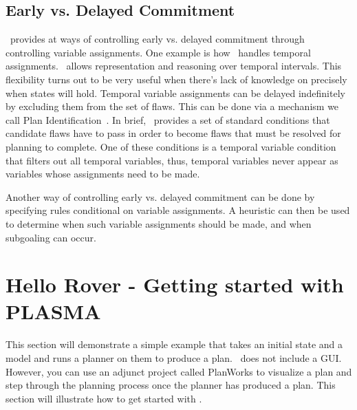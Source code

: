 \documentclass[10pt, letterpaper, twoside]{article}
\begin{document}
\subsection{Early vs. Delayed Commitment}
\label{commitment}
\ET\, provides at ways of controlling early vs. delayed commitment through
controlling variable assignments.  One example is how \ET\, handles
temporal assignments.  \ET\, allows representation and reasoning over
temporal intervals.  This flexibility turns out to be very useful when
there's lack of knowledge on precisely when states will hold.  Temporal
variable assignments can be delayed indefinitely by excluding them from the
set of flaws.  This can be done via a mechanism we call Plan
Identification~\cite{planid}.  In brief, \ET\, provides a set of standard
conditions that candidate flaws have to pass in order to become flaws that
must be resolved for planning to complete.  One of these conditions is a
temporal variable condition that filters out all temporal variables, thus,
temporal variables never appear as variables whose assignments need to be
made. 

Another way of controlling early vs. delayed commitment can be done by
specifying rules conditional on variable assignments.  A heuristic can then
be used to determine when such variable assignments should be made, and
when subgoaling can occur.

\section{Hello Rover - Getting started with PLASMA}
\label{started}
This section will demonstrate a simple example that takes an initial state
and a model and runs a planner on them to produce a plan.  \ET\, does not
include a GUI.  However, you can use an adjunct project called PlanWorks to
visualize a plan and step through the planning process once the planner has
produced a plan.  This section will illustrate how to get started with \ET.
\end{document}
